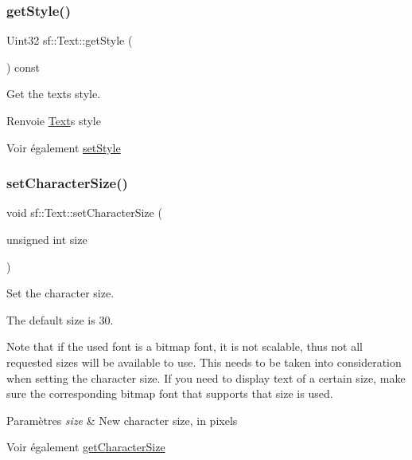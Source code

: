 \subsubsection{\texorpdfstring{get\+Style()}{getStyle()}}
{\footnotesize\ttfamily Uint32 sf\+::\+Text\+::get\+Style (\begin{DoxyParamCaption}{ }\end{DoxyParamCaption}) const}



Get the text\textquotesingle{}s style. 

\begin{DoxyReturn}{Renvoie}
\hyperlink{classsf_1_1Text}{Text}\textquotesingle{}s style
\end{DoxyReturn}
\begin{DoxySeeAlso}{Voir également}
\hyperlink{classsf_1_1Text_ad791702bc2d1b6590a1719aa60635edf}{set\+Style} 
\end{DoxySeeAlso}
\mbox{\label{classsf_1_1Text_ae96f835fc1bff858f8a23c5b01eaaf7e}} 
\subsubsection{\texorpdfstring{set\+Character\+Size()}{setCharacterSize()}}
{\footnotesize\ttfamily void sf\+::\+Text\+::set\+Character\+Size (\begin{DoxyParamCaption}\item[{unsigned int}]{size }\end{DoxyParamCaption})}



Set the character size. 

The default size is 30.

Note that if the used font is a bitmap font, it is not scalable, thus not all requested sizes will be available to use. This needs to be taken into consideration when setting the character size. If you need to display text of a certain size, make sure the corresponding bitmap font that supports that size is used.


\begin{DoxyParams}{Paramètres}
{\em size} & New character size, in pixels\\
\hline
\end{DoxyParams}
\begin{DoxySeeAlso}{Voir également}
\hyperlink{classsf_1_1Text_a46d1d7f1d513bb8d434e985a93ea5224}{get\+Character\+Size} 
\end{DoxySeeAlso}
\mbox{\label{classsf_1_1Text_afd1742fca1adb6b0ea98357250ffb634}} 
